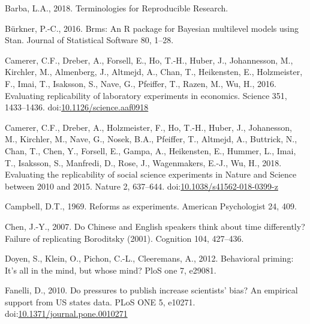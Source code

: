 \documentclass[]{elsarticle} %
\newlength{\cslhangindent}
\newlength{\cslentryspacingunit} %
\newenvironment{CSLReferences}[2] %
 {%
  \setlength{\parindent}{0pt}
  \ifodd #1
  \let\oldpar\par
  \def\par{\hangindent=\cslhangindent\oldpar}
  \fi
  \setlength{\parskip}{#2\cslentryspacingunit}
 }%
 {}
\begin{document}
\hypertarget{refs}{}
\begin{CSLReferences}{1}{0}
\leavevmode{}%
Barba, L.A., 2018. Terminologies for {Reproducible} {Research}.

\leavevmode{}%
Bürkner, P.-C., 2016. Brms: {An} {R} package for {Bayesian} multilevel
models using {Stan}. Journal of Statistical Software 80, 1--28.

\leavevmode{}%
Camerer, C.F., Dreber, A., Forsell, E., Ho, T.-H., Huber, J.,
Johannesson, M., Kirchler, M., Almenberg, J., Altmejd, A., Chan, T.,
Heikensten, E., Holzmeister, F., Imai, T., Isaksson, S., Nave, G.,
Pfeiffer, T., Razen, M., Wu, H., 2016. Evaluating replicability of
laboratory experiments in economics. Science 351, 1433--1436.
doi:\href{https://doi.org/10.1126/science.aaf0918}{10.1126/science.aaf0918}

\leavevmode{}%
Camerer, C.F., Dreber, A., Holzmeister, F., Ho, T.-H., Huber, J.,
Johanesson, M., Kirchler, M., Nave, G., Nosek, B.A., Pfeiffer, T.,
Altmejd, A., Buttrick, N., Chan, T., Chen, Y., Forsell, E., Gampa, A.,
Heikensten, E., Hummer, L., Imai, T., Isaksson, S., Manfredi, D., Rose,
J., Wagenmakers, E.-J., Wu, H., 2018. Evaluating the replicability of
social science experiments in {Nature} and {Science} between 2010 and
2015. Nature 2, 637--644.
doi:\href{https://doi.org/10.1038/s41562-018-0399-z}{10.1038/s41562-018-0399-z}

\leavevmode{}%
Campbell, D.T., 1969. Reforms as experiments. American Psychologist 24,
409.

\leavevmode{}%
Chen, J.-Y., 2007. Do {Chinese} and {English} speakers think about time
differently? {Failure} of replicating {Boroditsky} (2001). Cognition
104, 427--436.

\leavevmode{}%
Doyen, S., Klein, O., Pichon, C.-L., Cleeremans, A., 2012. Behavioral
priming: It's all in the mind, but whose mind? PloS one 7, e29081.

\leavevmode{}%
Fanelli, D., 2010. Do pressures to publish increase scientists' bias? An
empirical support from US states data. PLoS ONE 5, e10271.
doi:\href{https://doi.org/10.1371/journal.pone.0010271}{10.1371/journal.pone.0010271}


\end{CSLReferences}
\end{document}
